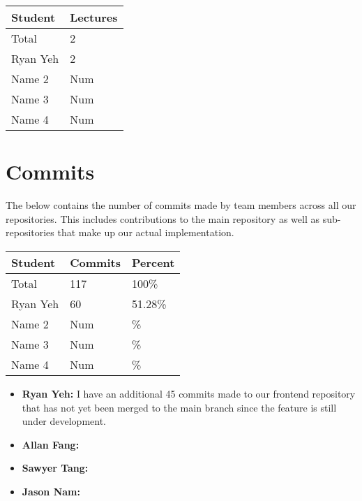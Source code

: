 \documentclass{article}
\begin{document}

\begin{table}[H]
\centering
\begin{tabular}{ll}
\toprule
\textbf{Student} & \textbf{Lectures}\\
\midrule
Total & 2\\
Ryan Yeh & 2\\
Name 2 & Num\\
Name 3 & Num\\
Name 4 & Num\\
\bottomrule
\end{tabular}
\end{table}


\section{Commits}


The below contains the number of commits made by team members across all our repositories. This includes
contributions to the main repository as well as sub-repositories that make up our actual implementation.

\begin{table}[H]
\centering
\begin{tabular}{lll}
\toprule
\textbf{Student} & \textbf{Commits} & \textbf{Percent}\\
\midrule
Total & 117 & 100\% \\
Ryan Yeh & 60 & 51.28\% \\
Name 2 & Num & \% \\
Name 3 & Num & \% \\
Name 4 & Num & \% \\
\bottomrule
\end{tabular}
\end{table}

\begin{itemize}
  \item \textbf{Ryan Yeh:} I have an additional 45 commits made to our frontend repository that has not yet been
  merged to the main branch since the feature is still under development.
  \item \textbf{Allan Fang:}
  \item \textbf{Sawyer Tang:}
  \item \textbf{Jason Nam:}
\end{itemize}
\end{document}
